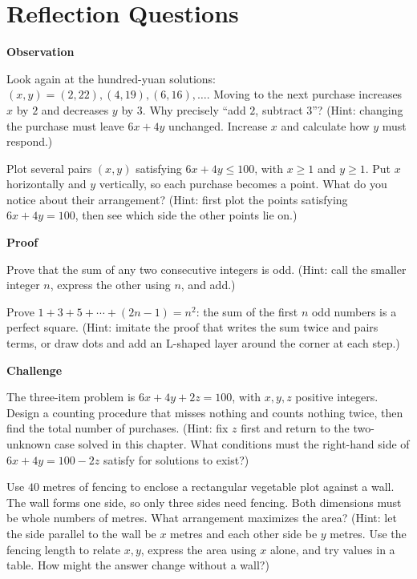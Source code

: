 \section*{Reflection Questions}

\textbf{Observation}

\begin{sikao}
\item Look again at the hundred-yuan solutions: $(x,y)=(2,22),(4,19),(6,16),\dots$. Moving to the next purchase increases $x$ by $2$ and decreases $y$ by $3$. Why precisely ``add $2$, subtract $3$''? (Hint: changing the purchase must leave $6x+4y$ unchanged. Increase $x$ and calculate how $y$ must respond.)
\item Plot several pairs $(x,y)$ satisfying $6x+4y\leq100$, with $x\geq1$ and $y\geq1$. Put $x$ horizontally and $y$ vertically, so each purchase becomes a point. What do you notice about their arrangement? (Hint: first plot the points satisfying $6x+4y=100$, then see which side the other points lie on.)
\end{sikao}

\textbf{Proof}

\begin{sikao}
\item Prove that the sum of any two consecutive integers is odd. (Hint: call the smaller integer $n$, express the other using $n$, and add.)
\item Prove $1+3+5+\cdots+(2n-1)=n^2$: the sum of the first $n$ odd numbers is a perfect square. (Hint: imitate the proof that writes the sum twice and pairs terms, or draw dots and add an L-shaped layer around the corner at each step.)
\end{sikao}

\textbf{Challenge}

\begin{sikao}
\item The three-item problem is $6x+4y+2z=100$, with $x,y,z$ positive integers. Design a counting procedure that misses nothing and counts nothing twice, then find the total number of purchases. (Hint: fix $z$ first and return to the two-unknown case solved in this chapter. What conditions must the right-hand side of $6x+4y=100-2z$ satisfy for solutions to exist?)
\item Use $40$ metres of fencing to enclose a rectangular vegetable plot against a wall. The wall forms one side, so only three sides need fencing. Both dimensions must be whole numbers of metres. What arrangement maximizes the area? (Hint: let the side parallel to the wall be $x$ metres and each other side be $y$ metres. Use the fencing length to relate $x,y$, express the area using $x$ alone, and try values in a table. How might the answer change without a wall?)
\end{sikao}

